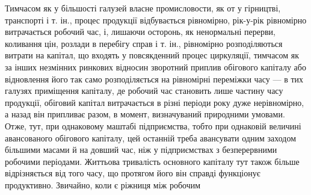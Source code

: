 Тимчасом як у більшості галузей власне промисловости, як от у гірництві,
транспорті і т. ін., процес продукції відбувається рівномірно, рік-у-рік
рівномірно витрачається робочий час, і, лишаючи осторонь, як ненормальні
перерви, коливання цін, розлади в перебігу справ і т. ін., рівномірно
розподіляються витрати на капітал, що входять у повсякденний процес
циркуляції, тимчасом як за інших незмінних ринкових відносин
зворотний приплив обігового капіталу або відновлення його так само
розподіляється на рівномірні переміжки часу — в тих галузях приміщення
капіталу, де робочий час становить лише частину часу продукції, обіговий
капітал витрачається в різні періоди року дуже нерівномірно, а назад
він припливає разом, в момент, визначуваний природними умовами. Отже,
тут, при однаковому маштабі підприємства, тобто при однаковій величині
авансованого обігового капіталу, цей останній треба авансувати одним
заходом більшими масами й на довший час, ніж у підприємствах з безперервними
робочими періодами. Життьова тривалість основного капіталу
тут також більше відрізняється від того часу, що протягом його він
справді функціонує продуктивно. Звичайно, коли є ріжниця між робочим
\parbreak{}  %
